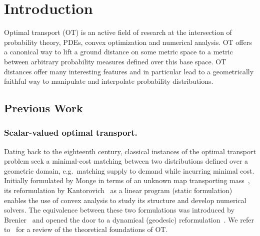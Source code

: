 
\section{Introduction}
\label{sec-intro}


Optimal transport (OT) is an active field of research at the intersection of probability theory, PDEs, convex optimization and numerical analysis. 
%
OT offers a canonical way to lift a ground distance on some metric space to a metric between arbitrary probability measures defined over this base space. OT distances offer many interesting  features and in particular lead to a geometrically faithful way to manipulate and interpolate probability distributions.




\subsection{Previous Work}

\subsubsection{Scalar-valued optimal transport.}
%
Dating back to the eighteenth century, classical instances of the optimal transport problem seek a minimal-cost matching between two distributions defined over a geometric domain, e.g.\ matching supply to demand while incurring minimal cost. 
Initially formulated by Monge in terms of an unknown map transporting mass~, its reformulation by Kantorovich~ as a linear program (static formulation) enables the use of convex analysis to study its structure and develop numerical solvers. 
% 
The equivalence between these two formulations was introduced by Brenier~ and opened the door to a dynamical (geodesic) reformulation~\cite{benamou2000computational}. We refer to~\cite{santambrogio2015optimal} for a review of the theoretical foundations of OT. 
%

